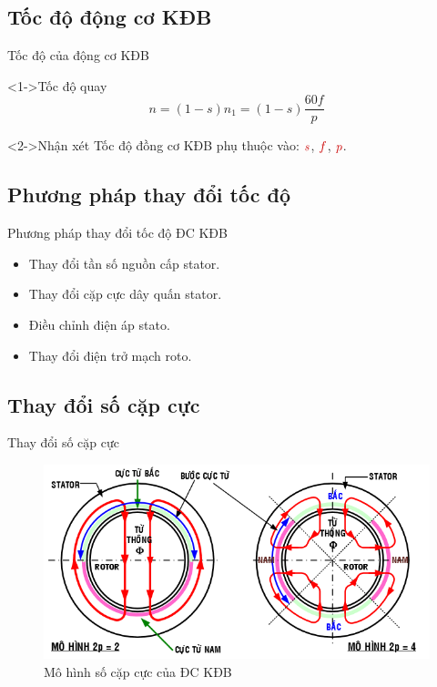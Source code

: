 \documentclass[20pt]{beamer}
\begin{document}
\subsection*{Tốc độ động cơ KĐB}
\begin{frame}{Tốc độ của động cơ KĐB}
	\begin{block}<1->{Tốc độ quay}
		$$ n = \left({1-s}\right)n_1 = \left({1-s}\right) \dfrac{60f}{p}$$
	\end{block}

	\begin{block}<2->{Nhận xét}
		\justifying
		Tốc độ đồng cơ KĐB phụ thuộc vào: $\textcolor{doden}{s}$, $\textcolor{doden}{f}$, $\textcolor{doden}{p}$.
	\end{block}
\end{frame}

\subsection*{Phương pháp thay đổi tốc độ}
\begin{frame}[t]{Phương pháp thay đổi tốc độ ĐC KĐB}
	\begin{itemize}
		\item Thay đổi tần số nguồn cấp stator.
		\item Thay đổi cặp cực dây quấn stator.
		\item Điều chỉnh điện áp stato.
		\item Thay đổi điện trở mạch roto.
	\end{itemize}
\end{frame}

\subsection*{Thay đổi số cặp cực}
\begin{frame}{Thay đổi số cặp cực}
	\begin{figure}
		\begin{center}
			\includegraphics[scale=.55]{images-chude2/2-and-4-pole-AC3P.png} 
		\end{center}
		\caption{Mô hình số cặp cực của ĐC KĐB}
	\end{figure}
\end{frame}
\end{document}
